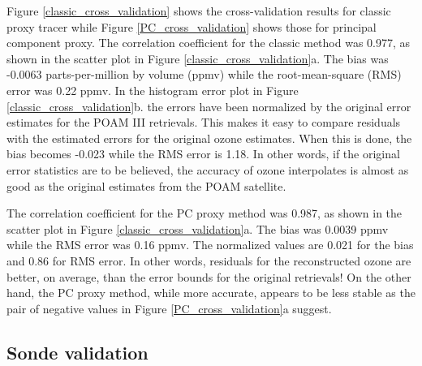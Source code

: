 Figure \ref{classic_cross_validation} shows the cross-validation results
for classic proxy tracer while Figure \ref{PC_cross_validation} shows
those for principal component proxy.
The correlation coefficient for the classic method was 0.977, as shown in 
the scatter plot in Figure \ref{classic_cross_validation}a.
The bias was -0.0063 parts-per-million by volume (ppmv) while the root-mean-square (RMS) error was 0.22 ppmv.
In the histogram error plot in Figure \ref{classic_cross_validation}b.
the errors have been normalized by the original error estimates for the
POAM III retrievals.
This makes it easy to compare residuals with the estimated errors
for the original ozone estimates.
When this is done, the bias becomes -0.023 while the RMS error is 1.18.
In other words, if the original error statistics are to be believed, 
the accuracy of ozone interpolates is almost as good as the original estimates
from the POAM satellite.

The correlation coefficient for the PC proxy method was 0.987, as shown in 
the scatter plot in Figure \ref{classic_cross_validation}a.
The bias was 0.0039 ppmv while the RMS error was 0.16 ppmv.
The normalized values are 0.021 for the bias and 0.86 for RMS error.
In other words, residuals for the reconstructed ozone are better,
on average, than the error bounds for the original retrievals!
On the other hand, the PC proxy method, while more accurate, appears to be
less stable as the pair of negative values in Figure \ref{PC_cross_validation}a
suggest.

\subsection{Sonde validation}

